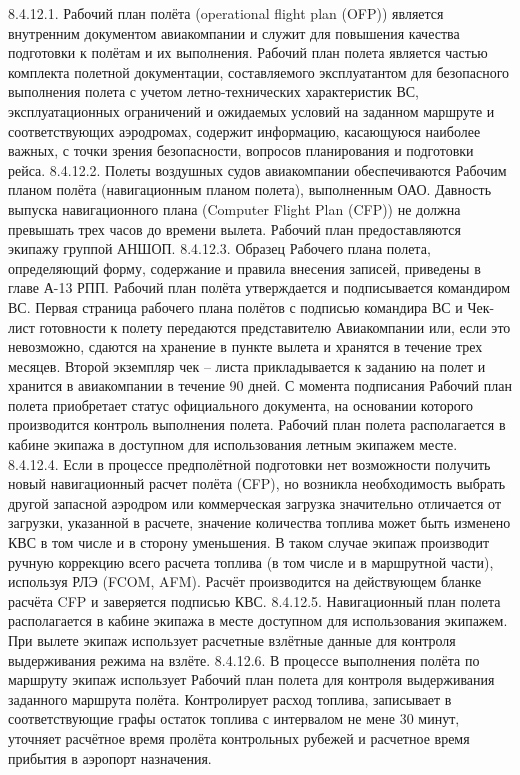 8.4.12.1. Рабочий план полёта (operational flight plan (OFP)) является внутренним документом авиакомпании и служит для повышения качества подготовки к полётам и их выполнения.
Рабочий план полета является частью комплекта полетной документации, составляемого эксплуатантом для безопасного выполнения полета с учетом летно-технических характеристик ВС, эксплуатационных ограничений и ожидаемых условий на заданном маршруте и соответствующих аэродромах, содержит информацию, касающуюся наиболее важных, с точки зрения безопасности, вопросов планирования и подготовки рейса.
8.4.12.2. Полеты воздушных судов авиакомпании обеспечиваются Рабочим планом полёта (навигационным планом полета), выполненным ОАО. Давность выпуска навигационного плана (Computer Flight Plan (CFP)) не должна превышать трех часов до времени вылета. Рабочий план предоставляются экипажу группой АНШОП. 
8.4.12.3. Образец Рабочего плана полета, определяющий форму, содержание и правила внесения записей, приведены в главе А-13 РПП. Рабочий план полёта утверждается и подписывается командиром ВС. 
Первая страница рабочего плана полётов с подписью командира ВС и Чек-лист готовности к полету передаются представителю Авиакомпании или, если это невозможно, сдаются на хранение в пункте вылета и хранятся в течение трех месяцев. Второй экземпляр чек – листа прикладывается к заданию на полет и хранится в авиакомпании в течение 90 дней. С момента подписания Рабочий план полета приобретает статус официального документа, на основании которого производится контроль выполнения полета. Рабочий план полета располагается в кабине экипажа в доступном для использования летным экипажем месте.
8.4.12.4. Если в процессе предполётной подготовки нет возможности получить новый навигационный расчет полёта (СFP), но возникла необходимость выбрать другой запасной аэродром или коммерческая загрузка значительно отличается от загрузки, указанной в расчете, значение количества топлива может быть изменено КВС в том числе и в сторону уменьшения. В таком случае экипаж производит ручную коррекцию всего расчета топлива (в том числе и в маршрутной части), используя РЛЭ (FCOM, AFM). 
Расчёт производится на действующем бланке расчёта CFP и заверяется подписью КВС.
8.4.12.5. Навигационный план полета располагается в кабине экипажа в месте доступном для использования экипажем. При вылете экипаж использует расчетные взлётные данные для контроля выдерживания режима на взлёте.
8.4.12.6. В процессе выполнения полёта по маршруту экипаж использует Рабочий план полета для контроля выдерживания заданного маршрута полёта. Контролирует расход топлива, записывает в соответствующие графы остаток топлива с интервалом не мене 30 минут, уточняет расчётное время пролёта контрольных рубежей и расчетное время прибытия в аэропорт назначения.
